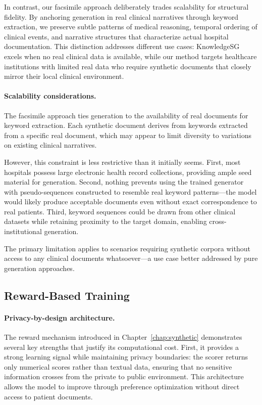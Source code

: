In contrast, our facsimile approach deliberately trades scalability for structural fidelity.
By anchoring generation in real clinical narratives through keyword extraction, we preserve subtle patterns of medical reasoning, temporal ordering of clinical events, and narrative structures that characterize actual hospital documentation.
This distinction addresses different use cases: KnowledgeSG excels when no real clinical data is available, while our method targets healthcare institutions with limited real data who require synthetic documents that closely mirror their local clinical environment.

\paragraph{Scalability considerations.}

The facsimile approach ties generation to the availability of real documents for keyword extraction.
Each synthetic document derives from keywords extracted from a specific real document, which may appear to limit diversity to variations on existing clinical narratives.

However, this constraint is less restrictive than it initially seems.
First, most hospitals possess large electronic health record collections, providing ample seed material for generation.
Second, nothing prevents using the trained generator with pseudo-sequences constructed to resemble real keyword patterns—the model would likely produce acceptable documents even without exact correspondence to real patients.
Third, keyword sequences could be drawn from other clinical datasets while retaining proximity to the target domain, enabling cross-institutional generation.

The primary limitation applies to scenarios requiring synthetic corpora without access to any clinical documents whatsoever—a use case better addressed by pure generation approaches.


\subsection{Reward-Based Training}

\paragraph{Privacy-by-design architecture.}

The reward mechanism introduced in Chapter~\ref{chap:synthetic} demonstrates several key strengths that justify its computational cost.
First, it provides a strong learning signal while maintaining privacy boundaries: the scorer returns only numerical scores rather than textual data, ensuring that no sensitive information crosses from the private to public environment.
This architecture allows the model to improve through preference optimization without direct access to patient documents.


